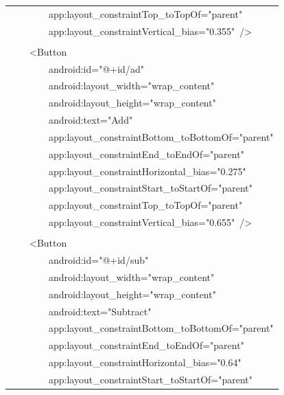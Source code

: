 \documentclass[a4paper,12pt]{article}
\begin{document}
\begin{longtable}{|p{}|}
{\ttfamily\small \ \ \ \ \ \ \ \ app:layout\_constraintTop\_toTopOf="parent"} \\
{\ttfamily\small \ \ \ \ \ \ \ \ app:layout\_constraintVertical\_bias="0.355"\ /\textgreater{}} \\
\strut \\
{\ttfamily\small \ \ \ \ \textless{}Button} \\
{\ttfamily\small \ \ \ \ \ \ \ \ android:id="@+id/ad"} \\
{\ttfamily\small \ \ \ \ \ \ \ \ android:layout\_width="wrap\_content"} \\
{\ttfamily\small \ \ \ \ \ \ \ \ android:layout\_height="wrap\_content"} \\
{\ttfamily\small \ \ \ \ \ \ \ \ android:text="Add"} \\
{\ttfamily\small \ \ \ \ \ \ \ \ app:layout\_constraintBottom\_toBottomOf="parent"} \\
{\ttfamily\small \ \ \ \ \ \ \ \ app:layout\_constraintEnd\_toEndOf="parent"} \\
{\ttfamily\small \ \ \ \ \ \ \ \ app:layout\_constraintHorizontal\_bias="0.275"} \\
{\ttfamily\small \ \ \ \ \ \ \ \ app:layout\_constraintStart\_toStartOf="parent"} \\
{\ttfamily\small \ \ \ \ \ \ \ \ app:layout\_constraintTop\_toTopOf="parent"} \\
{\ttfamily\small \ \ \ \ \ \ \ \ app:layout\_constraintVertical\_bias="0.655"\ /\textgreater{}} \\
\strut \\
{\ttfamily\small \ \ \ \ \textless{}Button} \\
{\ttfamily\small \ \ \ \ \ \ \ \ android:id="@+id/sub"} \\
{\ttfamily\small \ \ \ \ \ \ \ \ android:layout\_width="wrap\_content"} \\
{\ttfamily\small \ \ \ \ \ \ \ \ android:layout\_height="wrap\_content"} \\
{\ttfamily\small \ \ \ \ \ \ \ \ android:text="Subtract"} \\
{\ttfamily\small \ \ \ \ \ \ \ \ app:layout\_constraintBottom\_toBottomOf="parent"} \\
{\ttfamily\small \ \ \ \ \ \ \ \ app:layout\_constraintEnd\_toEndOf="parent"} \\
{\ttfamily\small \ \ \ \ \ \ \ \ app:layout\_constraintHorizontal\_bias="0.64"} \\
{\ttfamily\small \ \ \ \ \ \ \ \ app:layout\_constraintStart\_toStartOf="parent"} \\

\end{longtable}
\end{document}
